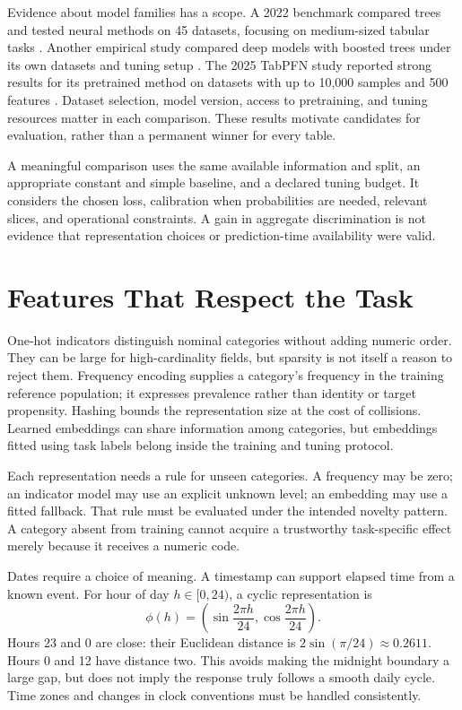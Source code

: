 Evidence about model families has a scope. A 2022 benchmark compared trees and tested neural methods on 45 datasets, focusing on medium-sized tabular tasks \citep{grinsztajn2022tabularnn}. Another empirical study compared deep models with boosted trees under its own datasets and tuning setup \citep{shwartz2022tabular}. The 2025 TabPFN study reported strong results for its pretrained method on datasets with up to 10,000 samples and 500 features \citep{hollmann2025tabpfn}. Dataset selection, model version, access to pretraining, and tuning resources matter in each comparison. These results motivate candidates for evaluation, rather than a permanent winner for every table.

A meaningful comparison uses the same available information and split, an appropriate constant and simple baseline, and a declared tuning budget. It considers the chosen loss, calibration when probabilities are needed, relevant slices, and operational constraints. A gain in aggregate discrimination is not evidence that representation choices or prediction-time availability were valid.

\section{Features That Respect the Task}
\label{sec:tabular-feateng}

One-hot indicators distinguish nominal categories without adding numeric order. They can be large for high-cardinality fields, but sparsity is not itself a reason to reject them. Frequency encoding supplies a category's frequency in the training reference population; it expresses prevalence rather than identity or target propensity. Hashing bounds the representation size at the cost of collisions. Learned embeddings can share information among categories, but embeddings fitted using task labels belong inside the training and tuning protocol.

Each representation needs a rule for unseen categories. A frequency may be zero; an indicator model may use an explicit unknown level; an embedding may use a fitted fallback. That rule must be evaluated under the intended novelty pattern. A category absent from training cannot acquire a trustworthy task-specific effect merely because it receives a numeric code.

Dates require a choice of meaning. A timestamp can support elapsed time from a known event. For hour of day $h\in[0,24)$, a cyclic representation is
\[
\phi(h)=\left(\sin\frac{2\pi h}{24},\cos\frac{2\pi h}{24}\right).
\]
Hours 23 and 0 are close: their Euclidean distance is $2\sin(\pi/24)\approx0.2611$. Hours 0 and 12 have distance two. This avoids making the midnight boundary a large gap, but does not imply the response truly follows a smooth daily cycle. Time zones and changes in clock conventions must be handled consistently.

